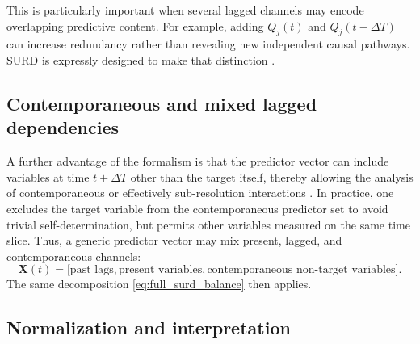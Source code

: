 \documentclass[12pt, a4paper]{article}
\begin{document}
This is particularly important when several lagged channels may encode overlapping predictive content. For example, adding \(Q_j(t)\) and \(Q_j(t-\Delta T)\) can increase redundancy rather than revealing new independent causal pathways. SURD is expressly designed to make that distinction \cite{MartinezSanchez2024SURD}.

\subsection{Contemporaneous and mixed lagged dependencies}

A further advantage of the formalism is that the predictor vector can include variables at time \(t+\Delta T\) other than the target itself, thereby allowing the analysis of contemporaneous or effectively sub-resolution interactions \cite{MartinezSanchez2024SURD}. In practice, one excludes the target variable from the contemporaneous predictor set to avoid trivial self-determination, but permits other variables measured on the same time slice. Thus, a generic predictor vector may mix present, lagged, and contemporaneous channels:
\begin{equation}
\mathbf{X}(t)=
\bigl[
\text{past lags},
\text{present variables},
\text{contemporaneous non-target variables}
\bigr].
\end{equation}
The same decomposition \eqref{eq:full_surd_balance} then applies.

\subsection{Normalization and interpretation}
\end{document}
